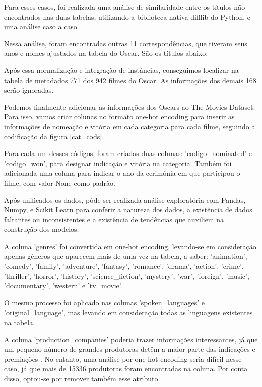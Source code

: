             Para esses casos, foi realizada uma análise de similaridade entre os títulos não encontrados nas duas tabelas, utilizando a biblioteca nativa difflib do Python, e uma análise caso a caso.

            Nessa análise, foram encontradas outras 11 correspondências, que tiveram seus anos e nomes ajustados na tabela do Oscar. São os títulos abaixo:\newline

            Após essa normalização e integração de instâncias, conseguimos localizar na tabela de metadados 771 dos 942 filmes do Oscar. As informações dos demais 168 serão ignoradas.

            Podemos finalmente adicionar as informações dos Oscars ao The Movies Dataset. Para isso, vamos criar colunas no formato one-hot encoding para inserir as informações de nomeação e vitória em cada categoria para cada filme, seguindo a codificação da figura \ref{cat_cods}.

            Para cada um desses códigos, foram criadas duas colunas: '{codigo}\_nominated' e '{codigo}\_won', para designar indicação e vitória na categoria. Também foi adicionada uma coluna para indicar o ano da cerimônia em que participou o filme, com valor None como padrão.\newline

            Após unificados os dados, pôde ser realizada análise exploratória com Pandas, Numpy, e Scikit Learn para conferir a natureza dos dados, a existência de dados faltantes ou inconsistentes e a existência de tendências que auxiliem na construção dos modelos.\newline

            A coluna 'genres' foi convertida em one-hot encoding, levando-se em consideração apenas gêneros que aparecem mais de uma vez na tabela, a saber: 'animation', 'comedy', 'family', 'adventure', 'fantasy', 'romance', 'drama', 'action', 'crime', 'thriller', 'horror', 'history', 'science\_fiction', 'mystery', 'war', 'foreign', 'music', 'documentary', 'western' e 'tv\_movie'.

            O mesmo processo foi aplicado nas colunas 'spoken\_languages' e 'original\_language', mas levando em consideração todas as linguagens existentes na tabela.

            A coluna 'production\_companies' poderia trazer informações interessantes, já que um pequeno número de grandes produtoras detêm a maior parte das indicações e premiações \cite{argon2020}. No entanto, uma análise por one-hot encoding seria difícil nesse caso, já que mais de 15336 produtoras foram encontradas na coluna. Por conta disso, optou-se por remover também esse atributo.


